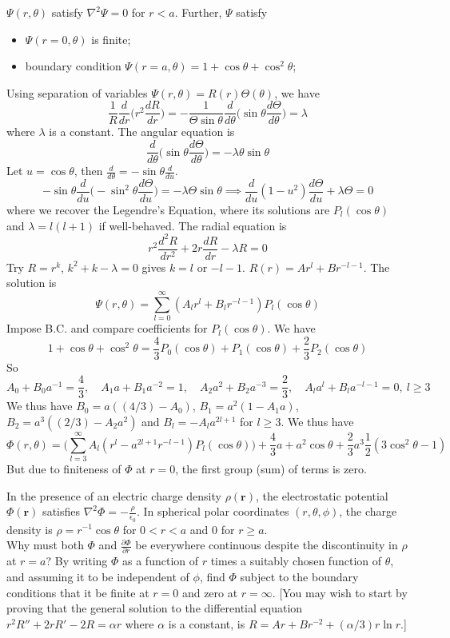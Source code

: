 \documentclass[a4paper]{article}
\begin{document}
\begin{ans}
$\Psi(r,\theta)$ satisfy $\nabla^2\Psi=0$ for $r<a$. Further, $\Psi$ satisfy
\begin{itemize}
    \item $\Psi(r=0,\theta)$ is finite;
    \item boundary condition $\Psi(r=a,\theta)=1+\cos\theta+\cos^2\theta$;
\end{itemize}
Using separation of variables $\Psi(r,\theta)=R(r)\Theta(\theta)$, we have
$$\frac{1}{R}\frac{d}{dr}\bigg(r^2\frac{dR}{dr}\bigg)=-\frac{1}{\Theta\sin\theta}\frac{d}{d\theta}\bigg(\sin\theta\frac{d\Theta}{d\theta}\bigg)=\lambda$$
where $\lambda$ is a constant. The angular equation is 
$$\frac{d}{d\theta}\bigg(\sin\theta\frac{d\Theta}{d\theta}\bigg)=-\lambda\theta\sin\theta$$
Let $u=\cos\theta$, then $\frac{d}{d\theta}=-\sin\theta\frac{d}{du}$. 
$$-\sin\theta\frac{d}{du}\bigg(-\sin^2\theta\frac{d\Theta}{du}\bigg)=-\lambda\Theta\sin\theta\implies\frac{d}{du}(1-u^2)\frac{d\Theta}{du}+\lambda\Theta=0$$
where we recover the Legendre's Equation, where its solutions are $P_l(\cos\theta)$ and $\lambda=l(l+1)$ if well-behaved. The radial equation is
$$r^2\frac{d^2R}{dr^2}+2r\frac{dR}{dr}-\lambda R=0$$
Try $R=r^k$, $k^2+k-\lambda=0$ gives $k=l$ or $-l-1$. $R(r)=Ar^l+Br^{-l-1}$. The solution is
$$\Psi(r,\theta)=\sum_{l=0}^\infty(A_lr^l+B_lr^{-l-1})P_l(\cos\theta)$$
Impose B.C. and compare coefficients for $P_l(\cos\theta)$. We have $$1+\cos\theta+\cos^2\theta=\frac{4}{3}P_0(\cos\theta)+P_1(\cos\theta)+\frac{2}{3}P_2(\cos\theta)$$
So 
$$A_0+B_0a^{-1}=\frac{4}{3},\quad A_1a+B_1a^{-2}=1,\quad A_2a^2+B_2a^{-3}=\frac{2}{3},\quad A_la^l+B_la^{-l-1}=0,~l\geq 3$$
We thus have $B_0=a((4/3)-A_0)$, $B_1=a^2(1-A_1a)$, $B_2=a^3((2/3)-A_2a^2)$ and $B_l=-A_la^{2l+1}$ for $l\geq 3$. We thus have
$$\Phi(r,\theta)=\bigg(\sum_{l=3}^\infty A_l(r^l-a^{2l+1}r^{-l-1})P_l(\cos\theta)\bigg)+\frac{4}{3}a+a^2\cos\theta+\frac{2}{3}a^3\frac{1}{2}(3\cos^2\theta-1)$$
But due to finiteness of $\Phi$ at $r=0$, the first group (sum) of terms is zero.
\end{ans}
\newpage
\begin{qns}
In the presence of an electric charge density $\rho(\mathbf{r})$, the electrostatic potential $\Phi(\mathbf{r})$ satisfies $\nabla^2\Phi=-\frac{\rho}{\epsilon_0}$. In spherical polar coordinates $(r,\theta,\phi)$, the charge density is $\rho=r^{-1}\cos\theta$ for $0<r<a$ and 0 for $r\geq a$.\\[5pt]
Why must both $\Phi$ and $\frac{\partial\Phi}{\partial r}$ be everywhere continuous despite the discontinuity in $\rho$ at $r = a$? By writing $\Phi$ as a function of $r$ times a suitably chosen function of $\theta$, and assuming it to be independent of $\phi$, find $\Phi$ subject to the boundary conditions that it be finite at $r = 0$ and zero at $r=\infty$. [You may wish to start by proving that the general solution to the differential equation $r^2R''+2rR'-2R=\alpha r$ where $\alpha$ is a constant, is $R=Ar+Br^{-2}+(\alpha/3)r\ln r$.]
\end{qns}
\end{document}
